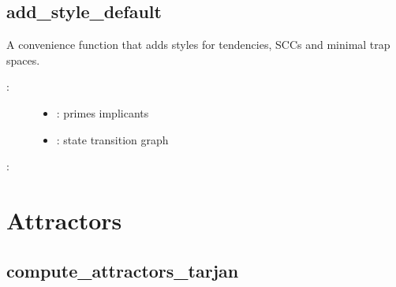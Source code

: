 \documentclass[letterpaper,10pt,english]{sphinxmanual}
\begin{document}
\subsection{add\_style\_default}
\label{\detokenize{StateTransitionGraphs:add-style-default}}\label{\detokenize{StateTransitionGraphs:stgs-add-style-default}}

\begin{fulllineitems}
\label{\detokenize{StateTransitionGraphs:PyBoolNet.StateTransitionGraphs.add_style_default}}
A convenience function that adds styles for tendencies, SCCs and minimal trap spaces.
\begin{description}
\item[{:}] \leavevmode\begin{itemize}
\item {} 
: primes implicants

\item {} 
: state transition graph

\end{itemize}

\end{description}

:

\begin{sphinxVerbatim}[commandchars=\\\{\}]
\end{sphinxVerbatim}

\end{fulllineitems}



\section{Attractors}
\label{\detokenize{Attractors:attractors}}\label{\detokenize{Attractors::doc}}\label{\detokenize{Attractors:id1}}

\subsection{compute\_attractors\_tarjan}
\label{\detokenize{Attractors:id2}}\label{\detokenize{Attractors:compute-attractors-tarjan}}
\end{document}
